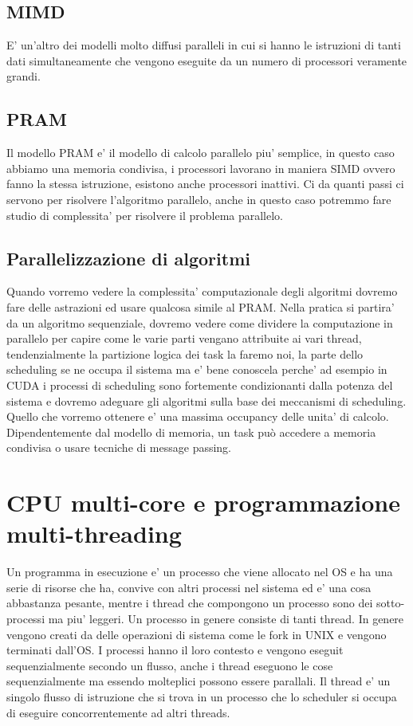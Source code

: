 \subsection{MIMD}
E' un'altro dei modelli molto diffusi paralleli in cui si hanno le istruzioni di tanti dati simultaneamente che vengono eseguite da un numero di processori veramente grandi.

\subsection{PRAM}
Il modello PRAM e' il modello di calcolo parallelo piu' semplice, in questo caso abbiamo una memoria condivisa, i processori lavorano in maniera SIMD ovvero fanno la stessa istruzione, esistono anche processori inattivi.
Ci da quanti passi ci servono per risolvere l'algoritmo parallelo, anche in questo caso potremmo fare studio di complessita' per risolvere il problema parallelo.

\subsection{Parallelizzazione di algoritmi}
Quando vorremo vedere la complessita' computazionale degli algoritmi dovremo fare delle astrazioni ed usare qualcosa simile al PRAM.
Nella pratica si partira' da un algoritmo sequenziale, dovremo vedere come dividere la computazione in parallelo per capire come le varie parti vengano attribuite ai vari thread, tendenzialmente la partizione logica dei task la faremo noi, la parte dello scheduling se ne occupa il sistema ma e' bene conoscela perche' ad esempio in CUDA i processi di scheduling sono fortemente condizionanti dalla potenza del sistema e dovremo adeguare gli algoritmi sulla base dei meccanismi di scheduling. Quello che vorremo ottenere e' una massima occupancy delle unita' di calcolo.
Dipendentemente dal modello di memoria, un task può accedere a memoria condivisa o usare tecniche di message passing.

\section{CPU multi-core e programmazione multi-threading}
Un programma in esecuzione e' un processo che viene allocato nel OS e ha una serie di risorse che ha, convive con altri processi nel sistema ed e' una cosa abbastanza pesante, mentre i thread che compongono un processo sono dei sotto-processi ma piu' leggeri. Un processo in genere consiste di tanti thread. In genere vengono creati da delle operazioni di sistema come le fork in UNIX e vengono terminati dall'OS.
I processi hanno il loro contesto e vengono eseguit sequenzialmente secondo un flusso, anche i thread eseguono le cose sequenzialmente ma essendo molteplici possono essere parallali.
Il thread e' un singolo flusso di istruzione che si trova in un processo che lo scheduler si occupa di eseguire concorrentemente ad altri threads.

